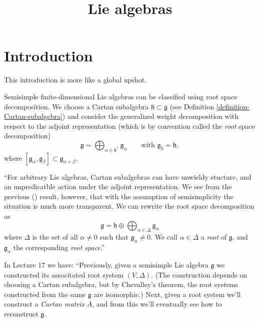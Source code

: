 



\title{Lie algebras}
\maketitle

\label{section-phantom}

\tableofcontents

\section{Introduction}
\label{section-introduction}

\noindent
This introduction is more like a global
upshot.

\medskip\noindent
Semisimple
finite-dimensional Lie algebras can be
classified using root space decomposition.
We choose a Cartan subalgebra
$\mathfrak{h}\subset\mathfrak{g}$ (see
Definition
\ref{definition-Cartan-subalgebra}) and
consider the generalized weight
decomposition with respect to the adjoint
representation (which is by convention
called the {\it root} space decomposition)
$$ \mathfrak{g}=\bigoplus_{\alpha \in
\mathfrak{h}^*}\mathfrak{g}_\alpha \qquad
\text{with }\mathfrak{g}_0=\mathfrak{h}, $$
where
$[\mathfrak{g}_\alpha,\mathfrak{g}_\beta]
\subset\mathfrak{g}_{\alpha+\beta}$.

``For arbitrary Lie algebras, Cartan
subalgebras can have unwieldy stucture, and
an unpredicatble action under the adjoint
representation. We see from the previous
(\cite[Lecture 12]{KLAL}) result, however,
that with the assumption of semisimplicity
the situation is much more transparent. We
can rewrite the root space decomposition as
$$
\mathfrak{g}=\mathfrak{h}
\oplus\bigoplus_{\alpha\in\Delta}\mathfrak{g}
_\alpha
$$ where $\Delta$ is the set of all
$\alpha\neq 0$ such that
$\mathfrak{g}_\alpha\neq 0$. We call
$\alpha \in \Delta$ a {\it root} of
$\mathfrak{g}$, and $\mathfrak{g}_\alpha$
the corresponding {\it root space}.''

In Lecture 17 we have: ``Previously, given
a semisimple Lie algebra $\mathfrak{g}$ we
constructed its associtated root system
$(V,\Delta)$. (The construction depends on
choosing a Cartan subalgebra, but by
Chevalley's theorem, the root systems
constructed from the same $\mathfrak{g}$
are isomorphic.) Next, given a root system
we'll construct a {\it Cartan matrix} $A$,
and from this we'll eventually see how to
reconstruct $\mathfrak{g}$.

